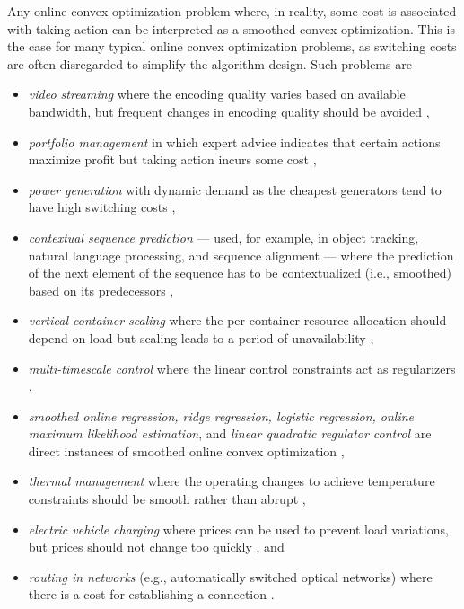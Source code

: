 Any online convex optimization problem where, in reality, some cost is associated with taking action can be interpreted as a smoothed convex optimization. This is the case for many typical online convex optimization problems, as switching costs are often disregarded to simplify the algorithm design. Such problems are

\begin{itemize}
    \item \emph{video streaming} where the encoding quality varies based on available bandwidth, but frequent changes in encoding quality should be avoided \cite{Lin2012},
    \item \emph{portfolio management} in which expert advice indicates that certain actions maximize profit but taking action incurs some cost \cite{Calafiore2008, Das2014, Ballu2019},
    \item \emph{power generation} with dynamic demand as the cheapest generators tend to have high switching costs \cite{Lin2012, Badiei2015},
    \item \emph{contextual sequence prediction} --- used, for example, in object tracking, natural language processing, and sequence alignment --- where the prediction of the next element of the sequence has to be contextualized (i.e., smoothed) based on its predecessors \cite{Kim2015},
    \item \emph{vertical container scaling} where the per-container resource allocation should depend on load but scaling leads to a period of unavailability \cite{Rossi2019},
    \item \emph{multi-timescale control} where the linear control constraints act as regularizers \cite{Goel2017},
    \item \emph{smoothed online regression, ridge regression, logistic regression, online maximum likelihood estimation}, and \emph{linear quadratic regulator control} are direct instances of smoothed online convex optimization \cite{Goel2018},
    \item \emph{thermal management} where the operating changes to achieve temperature constraints should be smooth rather than abrupt \cite{Zanini2009},
    \item \emph{electric vehicle charging} where prices can be used to prevent load variations, but prices should not change too quickly \cite{Kim2014}, and
    \item \emph{routing in networks} (e.g., automatically switched optical networks) where there is a cost for establishing a connection \cite{Lin2012}.
\end{itemize}
